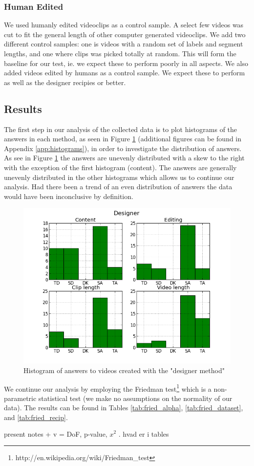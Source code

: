\subsubsection{Human Edited}
% 
We used humanly edited videoclips as a control sample. A select few videos was cut to fit the general length of other computer generated videoclips.
%
%
We add two different control samples: one is videos with a random set of labels and segment lengths, and one where clips was picked totally at random.
%
%
This will form the baseline for our test, ie. we expect these to perform poorly in all aspects. We also added videos edited by humans as a control sample. We expect these to perform as well as the designer recipies or better.
%
\subsection{Results}
%
The first step in our analysis of the collected data is to plot histograms of the answers in each method, as seen in Figure \ref{fig:hist_design} (additional figures can be found in Appendix \ref{app:histograms}), in order to investigate the distribution of answers. As see in Figure \ref{fig:hist_design} the answers are unevenly distributed with a skew to the right with the exception of the first histogram (content). The answers are generally unevenly distributed in the other histograms which allows us to continue our analysis. Had there been a trend of an even distribution of answers the data would have been inconclusive by definition.
%
\begin{figure}
     \centering
     \includegraphics[width=1.0\textwidth]{img/designer_barplot.png}
     \caption{Histogram of answers to videos created with the "designer method"}\label{fig:hist_design}
\end{figure}
%
We continue our analysis by employing the Friedman test\footnote{http://en.wikipedia.org/wiki/Friedman\_test} which is a non-parametric statistical test (we make no assumptions on the normality of our data). The results can be found in Tables \ref{tab:fried_alpha}, \ref{tab:fried_dataset}, and \ref{tab:fried_recip}. 
%



%
present notes + v = DoF, p-value, $x^2$ . hvad er i tables %
%
